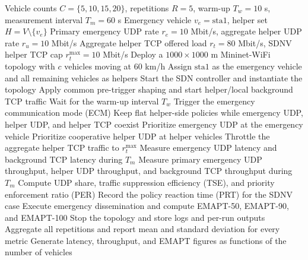 \begin{algorithm}[t]
\caption{V6 Cooperative Emergency Scalability Experiment}
\label{alg:v6-coop-scale}
\begin{algorithmic}[1]
\REQUIRE Vehicle counts $C=\{5,10,15,20\}$, repetitions $R=5$, warm-up $T_w=10$ s, measurement interval $T_m=60$ s
\REQUIRE Emergency vehicle $v_e=\mathrm{sta1}$, helper set $H=V\setminus\{v_e\}$
\REQUIRE Primary emergency UDP rate $r_e=10$ Mbit/s, aggregate helper UDP rate $r_{u}=10$ Mbit/s
\REQUIRE Aggregate helper TCP offered load $r_{t}=80$ Mbit/s, SDNV helper TCP cap $r_{t}^{\max}=10$ Mbit/s
    \STATE Deploy a $1000\times1000$ m Mininet-WiFi topology with $c$ vehicles moving at $60$ km/h
    \STATE Assign $\mathrm{sta1}$ as the emergency vehicle and all remaining vehicles as helpers
            \STATE Start the SDN controller and instantiate the topology
            \STATE Apply common pre-trigger shaping and start helper/local background TCP traffic
            \STATE Wait for the warm-up interval $T_w$
            \STATE Trigger the emergency communication mode (ECM)
                \STATE Keep flat helper-side policies while emergency UDP, helper UDP, and helper TCP coexist
            \ELSE
                \STATE Prioritize emergency UDP at the emergency vehicle
                \STATE Prioritize cooperative helper UDP at helper vehicles
                \STATE Throttle the aggregate helper TCP traffic to $r_{t}^{\max}$
            \ENDIF
            \STATE Measure emergency UDP latency and background TCP latency during $T_m$
            \STATE Measure primary emergency UDP throughput, helper UDP throughput, and background TCP throughput during $T_m$
            \STATE Compute UDP share, traffic suppression efficiency (TSE), and priority enforcement ratio (PER)
            \STATE Record the policy reaction time (PRT) for the SDNV case
            \STATE Execute emergency dissemination and compute EMAPT-50, EMAPT-90, and EMAPT-100
            \STATE Stop the topology and store logs and per-run outputs
        \ENDFOR
    \ENDFOR
\ENDFOR
\STATE Aggregate all repetitions and report mean and standard deviation for every metric
\STATE Generate latency, throughput, and EMAPT figures as functions of the number of vehicles
\end{algorithmic}
\end{algorithm}
